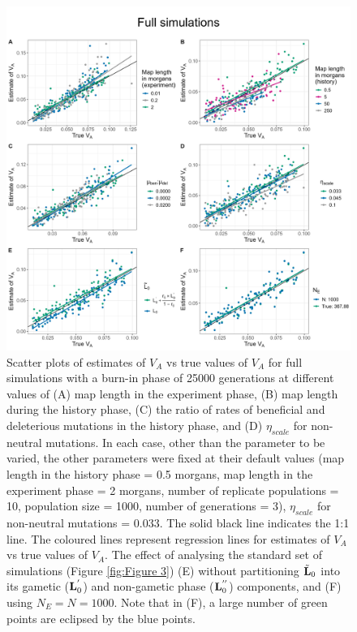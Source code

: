 \documentclass[12pt]{article}
\begin{document}
\begin{bibunit}
\begin{figure}[H]
\includegraphics[scale = 0.12]{Figures/Fig4.jpg}
\caption{Scatter plots of estimates of $V_A$ vs true values of $V_A$ for full simulations with a burn-in phase of 25000 generations at different values of (A) map length in the experiment phase, (B) map length during the history phase, (C) the ratio of rates of beneficial and deleterious mutations in the history phase, and (D) $\eta_{scale}$ for non-neutral mutations. In each case, other than the parameter to be varied, the other parameters were fixed at their default values (map length in the history phase = 0.5 morgans, map length in the experiment phase = 2 morgans, number of replicate populations = 10, population size = 1000, number of generations = 3), $\eta_{scale}$ for non-neutral mutations = 0.033. The solid black line indicates the 1:1 line. The coloured lines represent regression lines for estimates of $V_A$ vs true values of $V_A$. The effect of analysing the standard set of simulations (Figure \ref{fig:Figure 3}) (E) without partitioning $\tilde{\bf L}_0$ into its gametic (${\bf L}^{'}_{0}$) and non-gametic phase (${\bf L}^{''}_{0}$) components, and (F) using $N_E = N = 1000$. Note that in (F), a large number of green points are eclipsed by the blue points.}
\label{fig:Figure 4}
\end{figure}


\end{bibunit}
\end{document}
